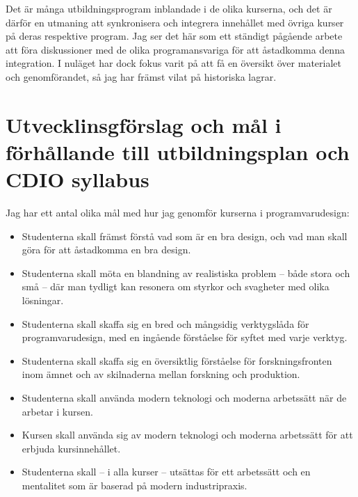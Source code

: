 \documentclass[10pt,t,a4paper]{article}
\begin{document}
Det är många utbildningsprogram inblandade i de olika kurserna, och det är därför en utmaning att synkronisera och integrera innehållet med övriga kurser på deras respektive program. Jag ser det här som ett ständigt pågående arbete att föra diskussioner med de olika programansvariga för att åstadkomma denna integration. I nuläget har dock fokus varit på att få en översikt över materialet och genomförandet, så jag har främst vilat på historiska lagrar.
\newpage
\section{Utvecklinsgförslag och mål i förhållande till utbildningsplan och CDIO syllabus}
\label{sec:orgheadline5}
Jag har ett antal olika mål med hur jag genomför kurserna i programvarudesign:

\begin{itemize}
\item Studenterna skall främst förstå vad som är en bra design, och vad man skall göra för att åstadkomma en bra design.
\item Studenterna skall möta en blandning av realistiska problem -- både stora och små -- där man tydligt kan resonera om styrkor och svagheter med olika lösningar.
\item Studenterna skall skaffa sig en bred och mångsidig verktygslåda för programvarudesign, med en ingående förståelse för syftet med varje verktyg.
\item Studenterna skall skaffa sig en översiktlig förståelse för forskningsfronten inom ämnet och av skilnaderna mellan forskning och produktion.
\item Studenterna skall använda modern teknologi och moderna arbetssätt när de arbetar i kursen.
\item Kursen skall använda sig av modern teknologi och moderna arbetssätt för att erbjuda kursinnehållet.
\item Studenterna skall -- i alla kurser -- utsättas för ett arbetssätt och en mentalitet som är baserad på modern industripraxis.
\end{itemize}
\end{document}
